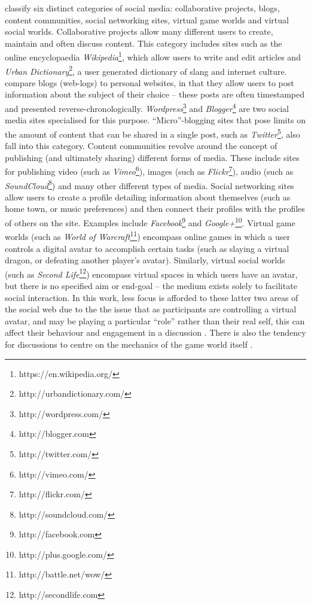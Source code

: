 \citet{Kaplan2010} classify six distinct categories of social media: collaborative projects, blogs, content communities, social networking sites, virtual game worlds and virtual social worlds. Collaborative projects allow many different users to create, maintain and often discuss content. This category includes sites such as the online encyclopaedia \textit{Wikipedia}\footnote{https://en.wikipedia.org/}, which allow users to write and edit articles and \textit{Urban Dictionary}\footnote{http://urbandictionary.com/‎}, a user generated dictionary of slang and internet culture. \citeauthor{Kaplan2010} compare blogs (web-logs) to personal websites, in that they allow users to post information about the subject of their choice -- these posts are often timestamped and presented reverse-chronologically. \textit{Wordpress}\footnote{http://wordpress.com/} and \textit{Blogger}\footnote{http://blogger.com} are two social media sites specialised for this purpose. ``Micro''-blogging sites that pose limits on the amount of content that can be shared in a single post, such as \textit{Twitter}\footnote{http://twitter.com/}, also fall into this category. Content communities revolve around the concept of publishing (and ultimately sharing) different forms of media. These include sites for publishing video (such as \textit{Vimeo}\footnote{http://vimeo.com/}), images (such as \textit{Flickr}\footnote{http://flickr.com/}), audio (such as \textit{SoundCloud}\footnote{http://soundcloud.com/}) and many other different types of media. Social networking sites allow users to create a profile detailing information about themselves (such as home town, or music preferences) and then connect their profiles with the profiles of others on the site. Examples include \textit{Facebook}\footnote{http://facebook.com} and \textit{Google+}\footnote{http://plus.google.com/}. Virtual game worlds (such as \textit{World of Warcraft}\footnote{http://battle.net/wow/}) encompass online games in which a user controls a digital avatar to accomplish certain tasks (such as slaying a virtual dragon, or defeating another player's avatar). Similarly, virtual social worlds (such as \textit{Second Life}\footnote{http://secondlife.com}) encompass virtual spaces in which users have an avatar, but there is no specified aim or end-goal -- the medium exists solely to facilitate social interaction. In this work, less focus is afforded to these latter two areas of the social web due to the the issue that as participants are controlling a virtual avatar, and may be playing a particular ``role'' rather than their real self, this can affect their behaviour and engagement in a discussion \cite{Hooi2013}. There is also the tendency for discussions to centre on the mechanics of the game world itself \citep{alagoz2013}.


